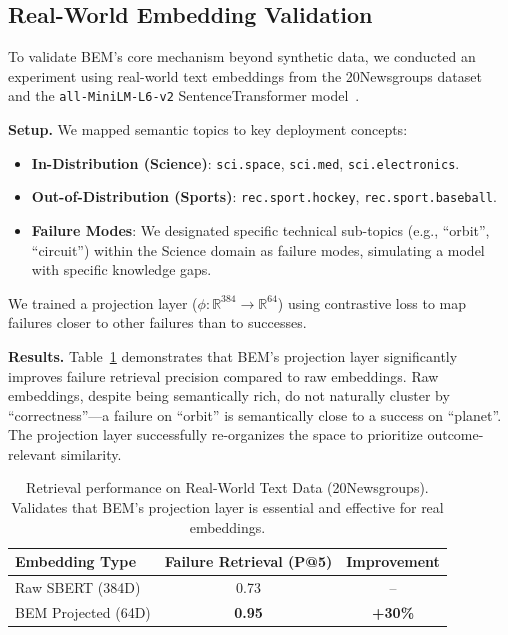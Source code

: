 \documentclass[twoside,11pt]{article}
\begin{document}
\subsection{Real-World Embedding Validation}
\label{sec:real_embeddings}

To validate BEM's core mechanism beyond synthetic data, we conducted an experiment using real-world text embeddings from the 20Newsgroups dataset~\citep{Lang1995} and the \texttt{all-MiniLM-L6-v2} SentenceTransformer model~\citep{Reimers2019}.

\textbf{Setup.} We mapped semantic topics to key deployment concepts:
\begin{itemize}
    \item \textbf{In-Distribution (Science)}: \texttt{sci.space}, \texttt{sci.med}, \texttt{sci.electronics}.
    \item \textbf{Out-of-Distribution (Sports)}: \texttt{rec.sport.hockey}, \texttt{rec.sport.baseball}.
    \item \textbf{Failure Modes}: We designated specific technical sub-topics (e.g., ``orbit'', ``circuit'') within the Science domain as failure modes, simulating a model with specific knowledge gaps.
\end{itemize}

We trained a projection layer ($\phi: \mathbb{R}^{384} \to \mathbb{R}^{64}$) using contrastive loss to map failures closer to other failures than to successes.

\textbf{Results.} Table~\ref{tab:real_emb} demonstrates that BEM's projection layer significantly improves failure retrieval precision compared to raw embeddings. Raw embeddings, despite being semantically rich, do not naturally cluster by ``correctness''---a failure on ``orbit'' is semantically close to a success on ``planet''. The projection layer successfully re-organizes the space to prioritize outcome-relevant similarity.

\begin{table}[ht]
\centering
\caption{Retrieval performance on Real-World Text Data (20Newsgroups). Validates that BEM's projection layer is essential and effective for real embeddings.}
\label{tab:real_emb}
\begin{tabular}{lcc}
\toprule
\textbf{Embedding Type} & \textbf{Failure Retrieval (P@5)} & \textbf{Improvement} \\
\midrule
Raw SBERT (384D) & 0.73 & -- \\
BEM Projected (64D) & \textbf{0.95} & \textbf{+30\%} \\
\bottomrule
\end{tabular}
\end{table}
\end{document}
